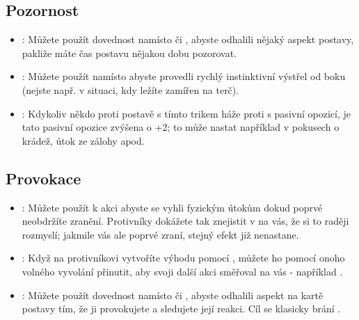 \subsection{Pozornost}
\label{sec:trik-pozornost}
\begin{itemize}

\item{}:
\label{sec:pozornost-ctenar}
Můžete použít dovednost  namísto  či , abyste odhalili nějaký aspekt postavy, pakliže máte čas postavu nějakou dobu pozorovat.

\item{}:
\label{sec:pozornost-strelba}
Můžete použít  namísto  abyste provedli rychlý instinktivní výstřel od boku (nejste např. v situaci, kdy ležíte zamířen na terč).

\item{}:
\label{sec:pozornost-smysl}
Kdykoliv někdo proti postavě s tímto trikem háže proti  s pasivní opozicí, je tato pasivní opozice zvýšena o +2; to může nastat například v pokusech o krádež, útok ze zálohy apod.
\end{itemize}




\subsection{Provokace}
\label{sec:trik-provokace}
\begin{itemize}
  
\item{}:
\label{sec:provokace-zbroj}
Můžete použít  k akci  abyste se vyhli fyzickým útokům dokud poprvé neobdržíte zranění. Protivníky dokážete tak znejistit v  na vás, že si to raději rozmyslí; jakmile vás ale poprvé zraní, stejný efekt již nenastane.

\item{}:
\label{sec:provokace-cos}
Když na protivníkovi vytvoříte výhodu pomocí , můžete ho pomocí onoho volného vyvolání přinutit, aby svoji další akci směřoval na vás - například .

\item{}:
\label{sec:provokace-stourani}
Můžete použít dovednost  namísto  či , abyste odhalili aspekt na kartě postavy tím, že ji provokujete a sledujete její reakci. Cíl se klasicky brání .
\end{itemize}

